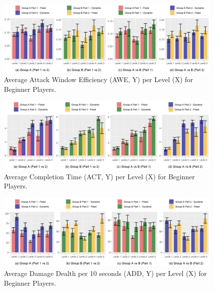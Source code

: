 \begin{figure}[!ht]
    \caption{Average Attack Window Efficiency (AWE, Y) per Level (X) for Beginner Players.}
    \begin{center}
        \includegraphics[width=34em]{figures/attack_window_efficiency-beginner_players.png}
    \end{center}
    \label{fig:result-metric-beginners-attack-window-efficiency}
\end{figure}

\begin{figure}[!ht]
    \caption{Average Completion Time (ACT, Y) per Level (X) for Beginner Players.}
    \begin{center}
        \includegraphics[width=34em]{figures/completion_time-beginner_players.png}
    \end{center}
    \label{fig:result-metric-beginners-completion-time}
\end{figure}

\begin{figure}[!ht]
    \caption{Average Damage Dealth per 10 seconds (ADD, Y) per Level (X) for Beginner Players.}
    \begin{center}
        \includegraphics[width=34em]{figures/damage_dealt_per_10s-beginner_players.png}
    \end{center}
    \label{fig:result-metric-beginners-damage-dealt-per-10s}
\end{figure}

